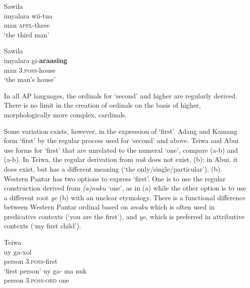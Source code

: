 \ea%
\label{bkm:Ref355277550}
Sawila\\
\gll   imyalara   wii-tua\\
   man    \textsc{appl-}three \\
\glt  `the third man'
\z








\ea%
\label{bkm:Ref342737790}
Sawila  \\
\gll imyalara   gi-\textbf{araasing} \\
    man    3.\textsc{poss}-house   \\
\glt`the man's house'
\z







In all AP languages, the ordinals for `second' and higher are regularly derived. There is no limit in the creation of ordinals on the basis of higher, morphologically more complex, cardinals.

Some variation exists, however, in the expression of `first'. Adang and Kamang form `first' by the regular process used for `second' and above. Teiwa and Abui use forms for `first' that are unrelated to the numeral `one', compare (a-b) and (a-b). In Teiwa, the regular derivation from \textit{nuk} does not exist, (b); in Abui, it does exist, but has a different meaning (`the only/single/particular'), (b). Western Pantar has two options to express `first'. One is to use the regular construction derived from \textit{(a)nuku} `one', as in (a) while the other option is to use a different root \textit{ye} (b) with an unclear etymology. There is a functional difference between Western Pantar ordinal based on \textit{anuku} which is often used in predicative contexts (`you are the first'), and \textit{ye}, which is preferred in attributive contexts (`my first child').


\ea%
\label{bkm:Ref342651040}
Teiwa \\
\ea
\gll  uy    ga-xol \\
     person    3\textsc{.poss}-first\\
\glt`first person'
\ex
\gll *uy    ga- ma    nuk\\
person    3\textsc{.poss-ord } one\\
\z\z



